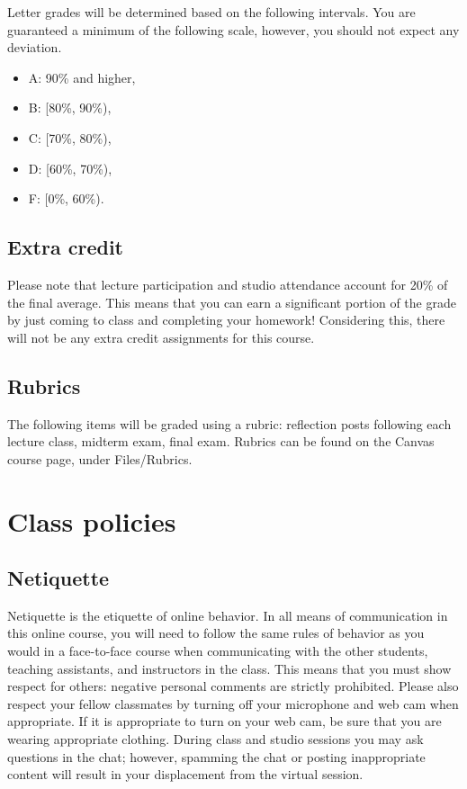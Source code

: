 \documentclass[11pt]{article}
\begin{document}
        Letter grades will be determined based on the following intervals. You are guaranteed a minimum of the following scale, however, you should not expect any deviation. 
        \begin{itemize}
            \item A: 90\% and higher, 
            \item B: [80\%, 90\%),
            \item C: [70\%, 80\%),
            \item D: [60\%, 70\%),
            \item  F: [0\%, 60\%). 
        \end{itemize}


    \subsection{Extra credit}
    \label{extraCredit}
    
    Please note that lecture participation and studio attendance account for 20\% of the final average. This means that you can earn a significant portion of the grade by just coming to class and completing your homework! Considering this, there will not be any extra credit assignments for this course.
    
    \subsection{Rubrics}
    The following items will be graded using a rubric: reflection posts following each lecture class, 
    midterm exam, final exam. Rubrics can be found on the Canvas course page, under Files/Rubrics.
    
\section{Class policies}

    \subsection{Netiquette}
    Netiquette is the etiquette of online behavior. In all means of communication in this online course, you will need to follow the same rules of behavior as you would in a face-to-face course when communicating with the other students, teaching assistants, and instructors in the class. This means that you must show respect for others: negative personal comments are strictly prohibited. Please also respect your fellow classmates by turning off your microphone and web cam when appropriate. If it is appropriate to turn on your web cam, be sure that you are wearing appropriate clothing. During class and studio sessions you may ask questions in the chat; however, spamming the chat or posting inappropriate content will result in your displacement from the virtual session. 
    
\end{document}
